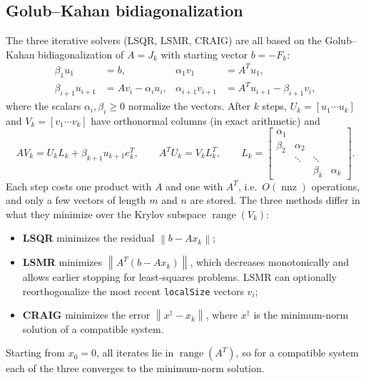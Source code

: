 \documentclass[11pt]{article}
\newcommand{\norm}[1]{\left\lVert #1 \right\rVert}
\newcommand{\code}[1]{\texttt{#1}}
\DeclareMathOperator{\range}{range}
\DeclareMathOperator{\nnz}{nnz}
\begin{document}
\subsection{Golub--Kahan bidiagonalization}
The three iterative solvers (LSQR, LSMR, CRAIG) are all based on the Golub--Kahan
bidiagonalization of $A = J_k$ with starting vector $b = -F_k$:
\begin{equation}
\begin{aligned}
  \beta_1 u_1 &= b, & \alpha_1 v_1 &= A^T u_1, \\
  \beta_{i+1} u_{i+1} &= A v_i - \alpha_i u_i, & \alpha_{i+1} v_{i+1} &= A^T u_{i+1} - \beta_{i+1} v_i ,
\end{aligned}
\label{eq:gk}
\end{equation}
where the scalars $\alpha_i, \beta_i \ge 0$ normalize the vectors. After $k$ steps,
$U_k = [u_1 \cdots u_k]$ and $V_k = [v_1 \cdots v_k]$ have orthonormal columns (in exact arithmetic) and
\begin{equation}
  A V_k = U_k L_k + \beta_{k+1} u_{k+1} e_k^T, \qquad A^T U_k = V_k L_k^T,
  \qquad
  L_k = \begin{bmatrix} \alpha_1 \\ \beta_2 & \alpha_2 \\ & \ddots & \ddots \\ && \beta_k & \alpha_k \end{bmatrix}.
\end{equation}
Each step costs one product with $A$ and one with $A^T$, i.e.\ $O(\nnz)$ operations, and only a few
vectors of length $m$ and $n$ are stored. The three methods differ in what they minimize over
the Krylov subspace $\range(V_k)$:
\begin{itemize}
  \item \textbf{LSQR} \cite{lsqr} minimizes the residual $\norm{b - A x_k}$;
  \item \textbf{LSMR} \cite{lsmr} minimizes $\norm{A^T(b - A x_k)}$, which decreases monotonically and
  allows earlier stopping for least-squares problems. LSMR can optionally reorthogonalize the
  most recent \code{localSize} vectors $v_i$;
  \item \textbf{CRAIG} \cite{saunders1995} minimizes the error $\norm{x^\dagger - x_k}$, where $x^\dagger$
  is the minimum-norm solution of a compatible system.
\end{itemize}
Starting from $x_0 = 0$, all iterates lie in $\range(A^T)$, so for a compatible system each of the three
converges to the minimum-norm solution.
\end{document}
